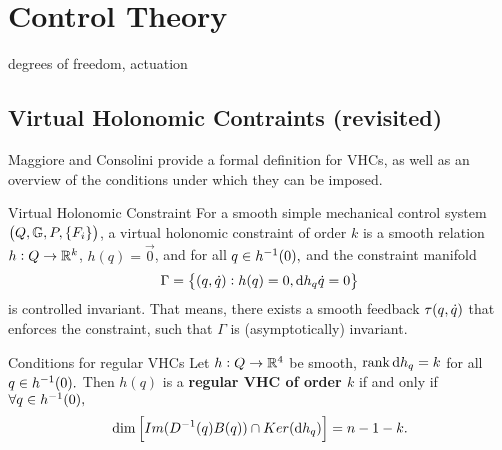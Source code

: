 \documentclass[main.tex]{subfiles}
\begin{document}
\section{Control Theory}
        degrees of freedom, actuation
\subsection{Virtual Holonomic Contraints (revisited)}\label{vhc-section}
Maggiore and Consolini provide a formal definition for VHCs, as well as an overview of the conditions under which they can be imposed\cite{maggiore2012virtual}.

\begin{boxdef}{Virtual Holonomic Constraint \cite{maggiore2012virtual}}
For a smooth simple mechanical control system $\del{Q,\mbbg,P,\cbr{F_i}}$, a virtual holonomic constraint of order $k$ is a smooth relation $h:Q\to\mathbb{R}^k$,
$h(q)=\vec{0}$, and for all $q\in h^{-1}(0),$ and the constraint manifold
\begin{align}
    \Gamma=\cbr{(q,\qd):h(q)=0,\dd h_q\qd=0}
\end{align}
is controlled invariant. That means, there exists a smooth feedback $\tau(q,\dot q)$ that enforces the constraint, such that $\Gamma$ is (asymptotically) invariant.
\end{boxdef}
\begin{boxthm}{Conditions for regular VHCs \cite{maggiore2012virtual}}
Let $h:Q\to\mathbb{R}^4$ be smooth, $\rank \dd h_q=k$ for all $q\in h^{-1}(0).$ Then $h(q)$ is a \textbf{regular VHC of order $k$} if and only if $\forall q\in h^{-1}(0),$
\begin{align}
     \dim\sbr{Im(D\inv(q)B(q))\cap Ker(\dd h_q)}=n-1-k.
\end{align}
\end{boxthm}
\end{document}
